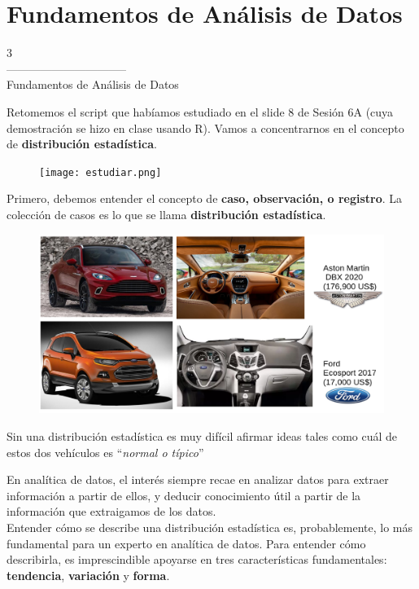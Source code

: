 \documentclass[aspectratio=169]{beamer}
\begin{document}
\section{Fundamentos de Análisis de Datos}
\begin{frame}
\begin{center}
\Huge
\textcolor{azulcesaclaro}{3\\
--------------------------------\\
Fundamentos de Análisis de Datos}
\end{center}
\end{frame}

\begin{frame}
Retomemos el script que habíamos estudiado en el slide 8 de Sesión 6A (cuya demostración se hizo en clase usando R). Vamos a concentrarnos en el concepto de \textbf{distribución estadística}.
\begin{figure}
\centering
\texttt{[image: estudiar.png]}
\end{figure}
\end{frame}

\begin{frame}
Primero, debemos entender el concepto de \textbf{caso, observación, o registro}. La colección de casos es lo que se llama \textbf{distribución estadística}.
\begin{figure}
\centering
\includegraphics[width=.65\textwidth]{casos.png}
\end{figure}
Sin una distribución estadística es muy difícil afirmar ideas tales como cuál de estos dos vehículos es ``\textit{normal o típico}''
\end{frame}

\begin{frame}
En analítica de datos, el interés siempre recae en analizar datos para extraer información a partir de ellos, y deducir conocimiento útil a partir de la información que extraigamos de los datos.\\
\vspace{0.5cm}
Entender cómo se describe una distribución estadística es, probablemente, lo más fundamental para un experto en analítica de datos. Para entender cómo describirla, es imprescindible apoyarse en tres características fundamentales: \textbf{tendencia}, \textbf{variación} y \textbf{forma}.
\end{frame}
\end{document}

